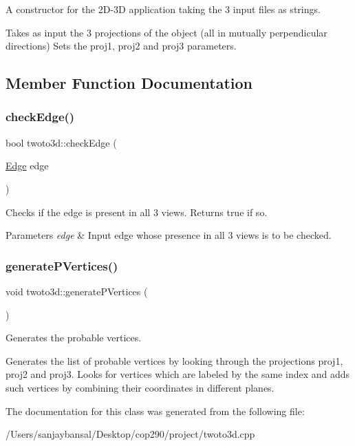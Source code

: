 A constructor for the 2\+D-\/3D application taking the 3 input files as strings. 

Takes as input the 3 projections of the object (all in mutually perpendicular directions) Sets the proj1, proj2 and proj3 parameters. 

\subsection{Member Function Documentation}
\mbox{\label{classtwoto3d_a7fdf12ceaffa00e9c0181ae1bcf30614}} 
\subsubsection{\texorpdfstring{check\+Edge()}{checkEdge()}}
{\footnotesize\ttfamily bool twoto3d\+::check\+Edge (\begin{DoxyParamCaption}\item[{\mbox{\hyperlink{struct_edge}{Edge}}}]{edge }\end{DoxyParamCaption})}



Checks if the edge is present in all 3 views. Returns true if so. 


\begin{DoxyParams}{Parameters}
{\em edge} & Input edge whose presence in all 3 views is to be checked. \\
\hline
\end{DoxyParams}
\mbox{\label{classtwoto3d_a7b7f3f38be16773db7b155f0be8fce6b}} 
\subsubsection{\texorpdfstring{generate\+P\+Vertices()}{generatePVertices()}}
{\footnotesize\ttfamily void twoto3d\+::generate\+P\+Vertices (\begin{DoxyParamCaption}{ }\end{DoxyParamCaption})}



Generates the probable vertices. 

Generates the list of probable vertices by looking through the projections proj1, proj2 and proj3. Looks for vertices which are labeled by the same index and adds such vertices by combining their coordinates in different planes. 

The documentation for this class was generated from the following file\+:\begin{DoxyCompactItemize}
\item 
/\+Users/sanjaybansal/\+Desktop/cop290/project/twoto3d.\+cpp\end{DoxyCompactItemize}
